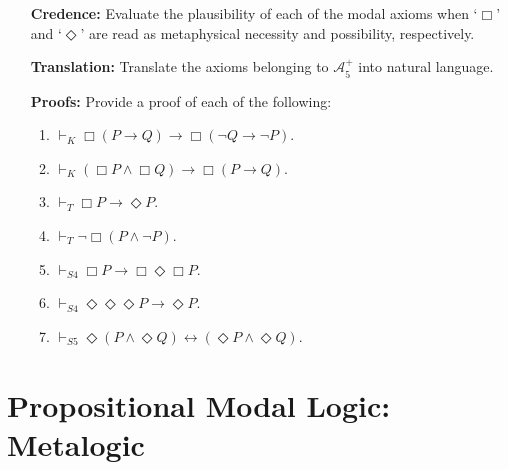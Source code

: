 \documentclass[a4paper, 11pt]{article} %
\begin{document}
\begin{enumerate}[leftmargin=1.2in,labelsep=.15in] 
\item[\bf Credence:] Evaluate the plausibility of each of the modal axioms when `$\Box$' and `$\Diamond$' are read as metaphysical necessity and possibility, respectively.
\item[\bf Translation:] Translate the axioms belonging to $\mathcal{A}_5^+$ into natural language. 
\item[\bf Proofs:] Provide a proof of each of the following: 
	\begin{enumerate}[label=(\arabic*),resume]\small
	\item $\vdash_{K} \Box(P\rightarrow Q)\rightarrow\Box(\neg Q\rightarrow \neg P)$.
	\item $\vdash_{K} (\Box P\wedge \Box Q)\rightarrow\Box(P\rightarrow Q)$.
	\item $\vdash_{T} \Box P\rightarrow\Diamond P$.
	\item $\vdash_{T} \neg\Box(P\wedge \neg P)$.
	\item $\vdash_{S4} \Box P\rightarrow\Box\Diamond\Box P$.
	\item $\vdash_{S4} \Diamond\Diamond\Diamond P\rightarrow\Diamond P$.
	\item $\vdash_{S5} \Diamond(P\wedge\Diamond Q)\leftrightarrow(\Diamond P\wedge\Diamond Q)$.
	\end{enumerate}
\end{enumerate}







\section*{\sc Propositional Modal Logic: Metalogic}
\end{document}
